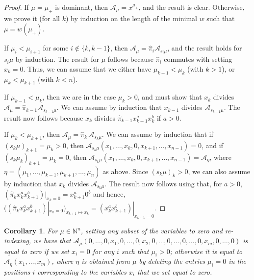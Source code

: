 \documentclass[12pt]{amsart}
\newtheorem{cor}[thm]{Corollary}
\theoremstyle{definition}
\theoremstyle{remark}
\newcommand{\NN}{{\mathbb N}}
\newcommand{\DemAt}{\widehat{\pi}}
\newcommand{\Acal}{{\mathcal A}}
\begin{document}
\begin{proof}
If $\mu =\mu _{+}$ is dominant, then $\Acal _{\mu } = x^{\mu _{+}}$,
and the result is clear.  Otherwise, we prove it (for all $k$) by
induction on the length of the minimal $w$ such that $\mu =w(\mu
_{+})$.

If $\mu _{i} < \mu _{i+1}$ for some $i\not \in \{k,k-1 \}$, then
$\Acal _{\mu } = \DemAt _{i}\Acal _{s_{i}\mu }$, and the result
holds for $s_{i}\mu $ by induction.  The result for $\mu $ follows
because $\DemAt _{i}$ commutes with setting $x_{k} = 0$.  Thus, we
can assume that we either have $\mu _{k-1} < \mu _{k}$ (with $k>1$),
or $\mu _{k} < \mu _{k+1}$ (with $k<n$).

If $\mu _{k-1} < \mu _{k}$, then we are in the case $\mu _{k} >0$, and
must show that $x_{k}$ divides $\Acal _{\mu } = \DemAt_{k-1} \Acal
_{s_{k-1}\mu }$.  We can assume by induction that $x_{k-1}$ divides $
\Acal _{s_{k-1}\mu }$.  The result now follows because $x_{k}$ divides
$\DemAt _{k-1} x_{k-1}^{a}x_{k}^{b}$ if $a>0$.

If $\mu _{k} <\mu _{k+1}$, then $\Acal _{\mu } = \DemAt_{k}\,
\Acal_{s_{k}\mu }$.  We can assume by induction that if $(s_k
\mu)_{k+1} = \mu_k > 0$, then $\Acal _{s_{k}\mu}(x_{1},\ldots,x_{k},0,
x_{k+1},\ldots,x_{n-1}) =0$, and if $(s_k \mu_k)_{k+1} = \mu_k = 0$,
then $\Acal_{s_{k}\mu}(x_{1},\ldots,x_{k},0, x_{k+1},\ldots,x_{n-1}) =
\Acal_\eta$, where $\eta = (\mu _{1}, \ldots, \mu _{k-1}, \mu _{k+1},
\ldots, \mu_{n})$ as above.  Since $(s_k \mu)_{k} >0$, we can also
assume by induction that $x_{k}$ divides $\Acal _{s_{k}\mu }$.  The
result now follows using that, for $a > 0$, $(\DemAt_{k}
x_{k}^{a}x_{k+1}^{b})|_{x_{k} = 0} = x_{k+1}^{a}0^{b}$ and hence,
$\big((\DemAt_{k} x_{k}^{a}x_{k+1}^{b})|_{x_{k} =
0}\big)_{x_{k+1}\mapsto x_k} = (x_{k}^{a}x_{k+1}^{b})|_{x_{k+1} = 0}$.
\end{proof}

\begin{cor}\label{cor:Amu-with-zeroes}
For $\mu \in \NN ^{n}$, setting any subset of the variables to zero
and re-indexing, we have that $\Acal _{\mu }(0,\ldots,0, x_{1},
0,\ldots,0, x_{2}, 0,\ldots,0, \ldots, 0,\ldots,0, x_{m}, 0,\ldots, 0)$
is equal to zero if we set $x_{i} = 0$ for any $i$ such that $\mu _{i}
>0$; otherwise it is equal to $\Acal _{\eta }(x_{1},\ldots,x_{m})$,
where $\eta $ is obtained from $\mu $ by deleting the entries $\mu
_{i} = 0$ in the positions $i$ corresponding to the variables $x_{i}$
that we set equal to zero.
\end{cor}
\end{document}
